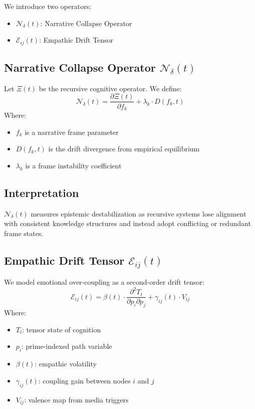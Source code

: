 \documentclass[12pt]{article}
\begin{document}
We introduce two operators:
\begin{itemize}
  \item $\mathcal{N}_\delta(t)$: Narrative Collapse Operator
  \item $\mathcal{E}_{ij}(t)$: Empathic Drift Tensor
\end{itemize}

\subsection{Narrative Collapse Operator $\mathcal{N}_\delta(t)$}

Let $\Xi(t)$ be the recursive cognitive operator. We define:
\begin{equation}
\mathcal{N}_\delta(t) = \frac{\partial \Xi(t)}{\partial f_k} + \lambda_k \cdot D(f_k, t)
\end{equation}
Where:
\begin{itemize}
  \item $f_k$ is a narrative frame parameter
  \item $D(f_k, t)$ is the drift divergence from empirical equilibrium
  \item $\lambda_k$ is a frame instability coefficient
\end{itemize}

\subsection{Interpretation}
$\mathcal{N}_\delta(t)$ measures epistemic destabilization as recursive systems lose alignment with consistent knowledge structures and instead adopt conflicting or redundant frame states.

\subsection{Empathic Drift Tensor $\mathcal{E}_{ij}(t)$}

We model emotional over-coupling as a second-order drift tensor:
\begin{equation}
\mathcal{E}_{ij}(t) = \beta(t) \cdot \frac{\partial^2 T_t}{\partial p_i \partial p_j} + \gamma_{ij}(t) \cdot V_{ij}
\end{equation}
Where:
\begin{itemize}
  \item $T_t$: tensor state of cognition
  \item $p_i$: prime-indexed path variable
  \item $\beta(t)$: empathic volatility
  \item $\gamma_{ij}(t)$: coupling gain between nodes $i$ and $j$
  \item $V_{ij}$: valence map from media triggers
\end{itemize}
\end{document}
